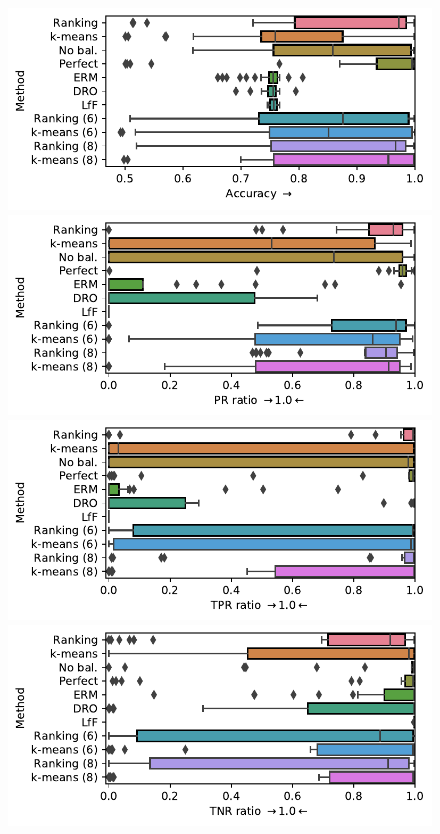 \begin{figure}[htp]
  \centering
  \includegraphics[width=\columnwidth]{figures/cmnist_2v4_miss_s_overcluster_acc.pdf}
  \includegraphics[width=\columnwidth]{figures/cmnist_2v4_miss_s_overcluster_prr.pdf}
  \includegraphics[width=\columnwidth]{figures/cmnist_2v4_miss_s_overcluster_tprr.pdf}
  \includegraphics[width=\columnwidth]{figures/cmnist_2v4_miss_s_overcluster_tnrr.pdf}

\end{figure}
